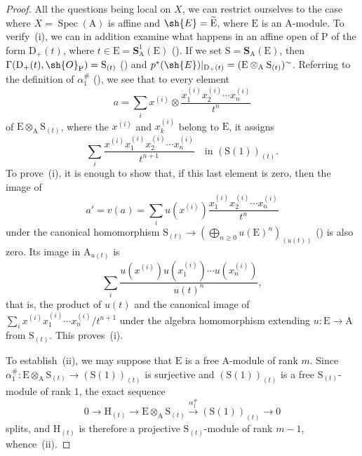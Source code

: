\begin{proof}
All the questions being local on $X$, we can restrict ourselves to the case where $X=\operatorname{Spec}(\mathrm{A})$ is affine and $\sh{E}=\widetilde{\mathrm{E}}$, where $\mathrm{E}$ is an $\mathrm{A}$-module.
To verify~(i), we can in addition examine what happens in an affine open of $\mathrm{P}$ of the form $\mathrm{D}_+(t)$, where $t\in\mathrm{E}=\mathbf{S}_\mathrm{A}^1(\mathrm{E})$ ().
If we set $\mathrm{S}=\mathbf{S}_\mathrm{A}(\mathrm{E})$, then
$\Gamma(\mathrm{D}_+(t),\sh{O}_{\mathrm{P}})=\mathrm{S}_{(t)}$ () and
$p^*(\sh{E})|_{\mathrm{D}_+(t)}=(\mathrm{E}\otimes_\mathrm{A}\mathrm{S}_{(t)})^\sim$.
Referring to the definition of $\alpha_1^{\#}$ (), we see that to every element
\[
  a=\sum_i x^{(i)}\otimes\frac{x_1^{(i)}x_2^{(i)}\cdots x_n^{(i)}}{t^n}
\]
of $\mathrm{E}\otimes_\mathrm{A}\mathrm{S}_{(t)}$, where the $x^{(i)}$ and $x_k^{(i)}$ belong to $\mathrm{E}$, it assigns
\[
  \sum_i\frac{x^{(i)}x_1^{(i)}x_2^{(i)}\cdots x_n^{(i)}}{t^{n+1}}
  \quad\text{in }(\mathrm{S}(1))_{(t)}.
\]
To prove~(i), it is enough to show that, if this last element is zero, then the image of
\[
  a'=v(a)=\sum_i u(x^{(i)})\frac{x_1^{(i)}x_2^{(i)}\cdots x_n^{(i)}}{t^n}
\]
under the canonical homomorphism
$\mathrm{S}_{(t)}\to\left(\bigoplus_{n\geq0}u(\mathrm{E})^n\right)_{(u(t))}$ () is also zero.
Its image in $\mathrm{A}_{u(t)}$ is
\[
  \sum_i\frac{u(x^{(i)})u(x_1^{(i)})\cdots u(x_n^{(i)})}{u(t)^n},
\]
that is, the product of $u(t)$ and the canonical image of
$\sum_i x^{(i)}x_1^{(i)}\cdots x_n^{(i)}/t^{n+1}$ under the algebra homomorphism extending $u:\mathrm{E}\to\mathrm{A}$ from $\mathrm{S}_{(t)}$. This proves~(i).

To establish~(ii), we may suppose that $\mathrm{E}$ is a free $\mathrm{A}$-module of rank $m$. Since $\alpha_1^{\#}:\mathrm{E}\otimes_\mathrm{A}\mathrm{S}_{(t)}\to(\mathrm{S}(1))_{(t)}$ is surjective and $(\mathrm{S}(1))_{(t)}$ is a free $\mathrm{S}_{(t)}$-module of rank $1$, the exact sequence
\[
  0\to\mathrm{H}_{(t)}\to\mathrm{E}\otimes_\mathrm{A}\mathrm{S}_{(t)}\xrightarrow{\alpha_1^{\#}}(\mathrm{S}(1))_{(t)}\to 0
\]
splits, and $\mathrm{H}_{(t)}$ is therefore a projective $\mathrm{S}_{(t)}$-module of rank $m-1$, whence~(ii).


\end{proof}
